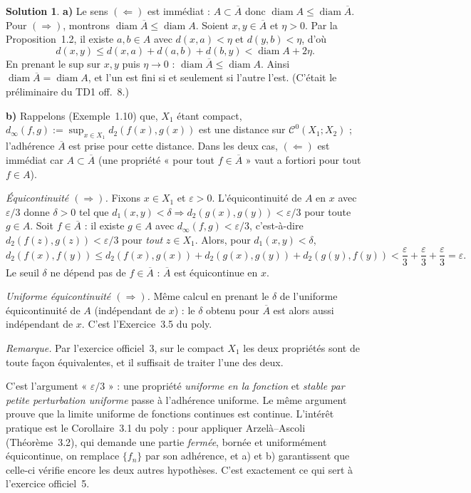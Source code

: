 \documentclass[11pt,a4paper]{article}
\newcommand{\adh}[1]{\overline{#1}}
\newcommand{\diam}{\operatorname{diam}}
\newcommand{\Cz}{\mathcal{C}^0}
\newcommand{\ie}{c'est-à-dire}
\theoremstyle{definition}
\newtheorem*{solution}{Solution}
\begin{document}
\begin{solution}
\noindent\textbf{a)} Le sens $(\Leftarrow)$ est immédiat : $A\subset\adh A$ donc $\diam A\le\diam\adh A$. Pour $(\Rightarrow)$, montrons $\diam\adh A\le\diam A$. Soient $x,y\in\adh A$ et $\eta>0$. Par la Proposition~1.2, il existe $a,b\in A$ avec $d(x,a)<\eta$ et $d(y,b)<\eta$, d'où
\[
d(x,y)\le d(x,a)+d(a,b)+d(b,y)<\diam A+2\eta .
\]
En prenant le sup sur $x,y$ puis $\eta\to0$ : $\diam\adh A\le\diam A$. Ainsi $\diam\adh A=\diam A$, et l'un est fini si et seulement si l'autre l'est. (C'était le préliminaire du TD1 off.~8.)

\medskip
\noindent\textbf{b)} Rappelons (Exemple~1.10) que, $X_1$ étant compact, $d_\infty(f,g):=\sup_{x\in X_1}d_2(f(x),g(x))$ est une distance sur $\Cz(X_1;X_2)$ ; l'adhérence $\adh A$ est prise pour cette distance. Dans les deux cas, $(\Leftarrow)$ est immédiat car $A\subset\adh A$ (une propriété « pour tout $f\in\adh A$ » vaut a fortiori pour tout $f\in A$).

\emph{Équicontinuité $(\Rightarrow)$.} Fixons $x\in X_1$ et $\varepsilon>0$. L'équicontinuité de $A$ en $x$ avec $\varepsilon/3$ donne $\delta>0$ tel que $d_1(x,y)<\delta\Rightarrow d_2(g(x),g(y))<\varepsilon/3$ pour toute $g\in A$. Soit $f\in\adh A$ : il existe $g\in A$ avec $d_\infty(f,g)<\varepsilon/3$, \ie{} $d_2(f(z),g(z))<\varepsilon/3$ pour \emph{tout} $z\in X_1$. Alors, pour $d_1(x,y)<\delta$,
\[
d_2(f(x),f(y))\le d_2(f(x),g(x))+d_2(g(x),g(y))+d_2(g(y),f(y))<\frac\varepsilon3+\frac\varepsilon3+\frac\varepsilon3=\varepsilon .
\]
Le seuil $\delta$ ne dépend pas de $f\in\adh A$ : $\adh A$ est équicontinue en $x$.

\emph{Uniforme équicontinuité $(\Rightarrow)$.} Même calcul en prenant le $\delta$ de l'uniforme équicontinuité de $A$ (indépendant de $x$) : le $\delta$ obtenu pour $\adh A$ est alors aussi indépendant de $x$. C'est l'Exercice~3.5 du poly.

\emph{Remarque.} Par l'exercice officiel~3, sur le compact $X_1$ les deux propriétés sont de toute façon équivalentes, et il suffisait de traiter l'une des deux.
\end{solution}

\begin{pointcle}
C'est l'argument « $\varepsilon/3$ » : une propriété \emph{uniforme en la fonction} et \emph{stable par petite perturbation uniforme} passe à l'adhérence uniforme. Le même argument prouve que la limite uniforme de fonctions continues est continue. L'intérêt pratique est le Corollaire~3.1 du poly : pour appliquer Arzelà--Ascoli (Théorème~3.2), qui demande une partie \emph{fermée}, bornée et uniformément équicontinue, on remplace $\{f_n\}$ par son adhérence, et a) et b) garantissent que celle-ci vérifie encore les deux autres hypothèses. C'est exactement ce qui sert à l'exercice officiel~5.
\end{pointcle}
\end{document}
